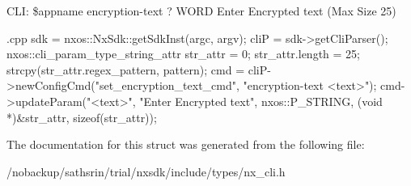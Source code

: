 CLI: \$appname encryption-\/text ? WORD Enter Encrypted text (Max Size 25)


\begin{DoxyCode}
 {.cpp}
       sdk = nxos::NxSdk::getSdkInst(argc, argv);
       cliP = sdk->getCliParser();
       nxos::cli_param_type_string_attr str_attr = {0};
       str_attr.length = 25;
       strcpy(str_attr.regex_pattern, pattern);
       cmd = cliP->newConfigCmd("set_encryption_text_cmd",
                                "encryption-text <text>");
       cmd->updateParam("<text>", "Enter Encrypted text", nxos::P_STRING,
                        (void *)&str_attr, sizeof(str_attr));
\end{DoxyCode}



 

The documentation for this struct was generated from the following file:\begin{DoxyCompactItemize}
\item 
/nobackup/sathsrin/trial/nxsdk/include/types/nx\_\-cli.h\end{DoxyCompactItemize}

